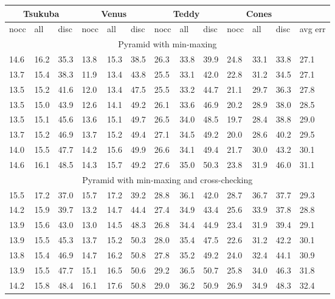 \begin{tabular}{|l|l|l||l|l|l||l|l|l||l|l|l||l|}
  \hline
  \multicolumn{3}{|c||}{Tsukuba} &
  \multicolumn{3}{c||}{Venus} &
  \multicolumn{3}{c||}{Teddy} &
  \multicolumn{3}{c||}{Cones} & ~ \\
  \hline
  nocc & all & disc & nocc & all & disc & nocc & all & disc & nocc & all & disc & avg err\\
  \hline
  \multicolumn{13}{|c|}{Pyramid with min-maxing} \\
  \hline
  14.6 & 16.2 & 35.3 & 13.8 & 15.3 & 38.5 & 26.3 & 33.8 & 39.9 & 24.8 & 33.1 & 33.8 & 27.1 \\
  13.7 & 15.4 & 38.3 & 11.9 & 13.4 & 43.8 & 25.5 & 33.1 & 42.0 & 22.8 & 31.2 & 34.5 & 27.1 \\
  13.5 & 15.2 & 41.6 & 12.0 & 13.4 & 47.5 & 25.5 & 33.2 & 44.7 & 21.1 & 29.7 & 36.3 & 27.8 \\
  13.5 & 15.0 & 43.9 & 12.6 & 14.1 & 49.2 & 26.1 & 33.6 & 46.9 & 20.2 & 28.9 & 38.0 & 28.5 \\
  13.5 & 15.1 & 45.6 & 13.6 & 15.1 & 49.7 & 26.5 & 34.0 & 48.5 & 19.7 & 28.4 & 38.8 & 29.0 \\
  13.7 & 15.2 & 46.9 & 13.7 & 15.2 & 49.4 & 27.1 & 34.5 & 49.2 & 20.0 & 28.6 & 40.2 & 29.5 \\
  14.0 & 15.5 & 47.7 & 14.2 & 15.6 & 49.9 & 26.6 & 34.1 & 49.4 & 21.7 & 30.0 & 43.2 & 30.1 \\
  14.6 & 16.1 & 48.5 & 14.3 & 15.7 & 49.2 & 27.6 & 35.0 & 50.3 & 23.8 & 31.9 & 46.0 & 31.1 \\
  \hline
  \multicolumn{13}{|c|}{Pyramid with min-maxing and cross-checking} \\
  \hline
  15.5 & 17.2 & 37.0 & 15.7 & 17.2 & 39.2 & 28.8 & 36.1 & 42.0 & 28.7 & 36.7 & 37.7 & 29.3 \\
  14.2 & 15.9 & 39.7 & 13.2 & 14.7 & 44.4 & 27.4 & 34.9 & 43.4 & 25.6 & 33.9 & 37.8 & 28.8 \\
  13.9 & 15.6 & 43.0 & 13.0 & 14.5 & 48.3 & 26.8 & 34.4 & 44.9 & 23.4 & 31.9 & 39.4 & 29.1 \\
  13.9 & 15.5 & 45.3 & 13.7 & 15.2 & 50.3 & 28.0 & 35.4 & 47.5 & 22.6 & 31.2 & 42.2 & 30.1 \\
  13.8 & 15.4 & 46.9 & 14.7 & 16.2 & 50.8 & 27.8 & 35.2 & 49.2 & 24.0 & 32.4 & 44.1 & 30.9 \\
  13.9 & 15.5 & 47.7 & 15.1 & 16.5 & 50.6 & 29.2 & 36.5 & 50.7 & 25.8 & 34.0 & 46.3 & 31.8 \\
  14.2 & 15.8 & 48.4 & 16.1 & 17.6 & 50.8 & 29.0 & 36.2 & 50.9 & 26.9 & 34.9 & 48.3 & 32.4 \\

\end{tabular}
